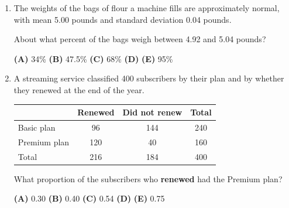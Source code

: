 \documentclass[12pt]{article}
\begin{document}
\begin{enumerate}[leftmargin=1.9em, itemsep=0.13in]
  \boxguard[8]
  \item The weights of the bags of flour a machine fills are approximately normal, with mean
        5.00 pounds and standard deviation 0.04 pounds.

        About what percent of the bags weigh between 4.92 and 5.04 pounds?\hfill{}\rule[-0.2in]{0pt}{0.48in}
        \par\vspace{3pt}\noindent
        \hspace{1.2em}\textbf{(A)} 34\% \hfill \textbf{(B)} 47.5\% \hfill
        \textbf{(C)} 68\% \hfill \textbf{(D)}  \hfill \textbf{(E)} 95\%

  \boxguard[13]
  \item A streaming service classified 400 subscribers by their plan and by whether they
        renewed at the end of the year.

        \vspace{2pt}
        {\centering\small
        \renewcommand{\arraystretch}{1.15}
        \begin{tabular}{@{} l c c c @{}}
        \rowcolor{sky}
         & \textbf{Renewed} & \textbf{Did not renew} & \textbf{Total} \\
        \midrule
        Basic plan   & 96  & 144 & 240 \\
        Premium plan & 120 & 40  & 160 \\
        \midrule
        Total        & 216 & 184 & 400 \\
        \end{tabular}\par}
        \vspace{4pt}

        What proportion of the subscribers who \textbf{renewed} had the Premium plan?\hfill{}\rule[-0.2in]{0pt}{0.48in}
        \par\vspace{3pt}\noindent
        \hspace{1.2em}\textbf{(A)} 0.30 \hfill \textbf{(B)} 0.40 \hfill
        \textbf{(C)} 0.54 \hfill \textbf{(D)}  \hfill \textbf{(E)} 0.75


\end{enumerate}
\end{document}
